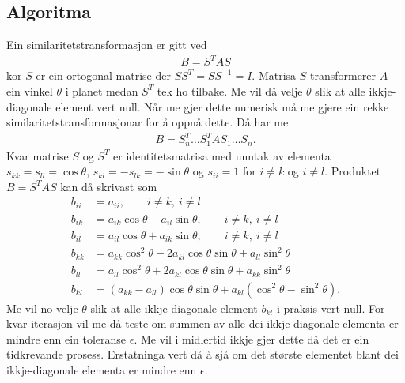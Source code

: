 \documentclass[11pt, a4paper]{article}
\begin{document}
  \subsection{Algoritma}
    Ein similaritetstransformasjon er gitt ved 
    \begin{align*}
      B = S^TAS
    \end{align*}
    kor $S$ er ein ortogonal matrise der $SS^T = SS^{-1} = I$. Matrisa $S$ transformerer $A$ ein vinkel $\theta$ i planet medan $S^T$ tek ho tilbake.
    Me vil då velje $\theta$ slik at alle ikkje-diagonale element vert null. Når me gjer dette numerisk må me gjere ein rekke similaritetstransformasjonar 
    for å oppnå dette. Då har me
    \begin{align*}
      B = S_n^T \dots S_1^TAS_1 \dots S_n.
    \end{align*}
    Kvar matrise $S$ og $S^T$ er identitetsmatrisa med unntak av elementa $s_{kk} = s_{ll} = \cos{\theta}$, $s_{kl} = -s_{lk} = -\sin{\theta}$ og 
    $s_{ii} = 1$ for $i \ne k$ og $i \ne l$. Produktet $B = S^TAS$ kan då skrivast som
    \begin{align*}
      b_{ii} &= a_{ii}, \qquad i \ne k, \ i \ne l \\
      b_{ik} &= a_{ik}\cos{\theta} - a_{il}\sin{\theta}, \qquad i \ne k, \ i \ne l \\
      b_{il} &= a_{il}\cos{\theta} + a_{ik}\sin{\theta}, \qquad i \ne k, \ i \ne l \\
      b_{kk} &= a_{kk}\cos^2{\theta} - 2a_{kl}\cos{\theta}\sin{\theta} + a_{ll}\sin^2{\theta} \\
      b_{ll} &= a_{ll}\cos^2{\theta} + 2a_{kl}\cos{\theta}\sin{\theta} + a_{kk}\sin^2{\theta} \\
      b_{kl} &= (a_{kk} - a_{ll})\cos{\theta}\sin{\theta} + a_{kl}(\cos^2{\theta} - \sin^2{\theta}).
    \end{align*}
    Me vil no velje $\theta$ slik at alle ikkje-diagonale element $b_{kl}$ i praksis vert null. For kvar iterasjon vil me då teste om summen av alle 
    dei ikkje-diagonale elementa er mindre enn ein toleranse $\epsilon$. Me vil i midlertid ikkje gjer dette då det er ein tidkrevande prosess. 
    Erstatninga vert då å sjå om det største elementet blant dei ikkje-diagonale elementa er mindre enn $\epsilon$.
\end{document}
